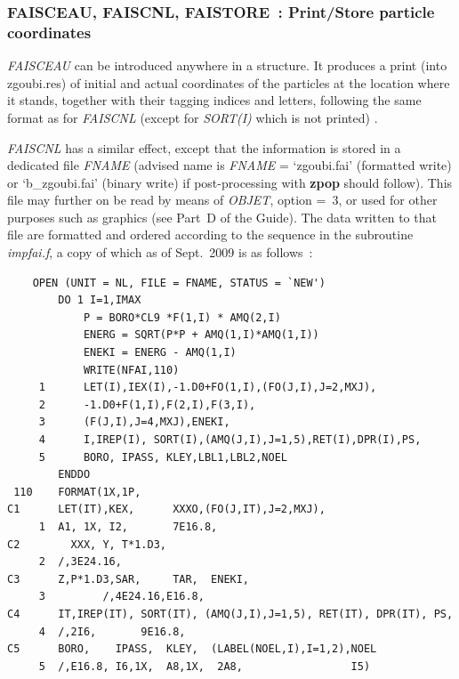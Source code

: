 \newpage

\subsubsection*{FAISCEAU, FAISCNL, FAISTORE~:  Print/Store particle coordinates} \label{FAISCEAU}\label{FAISCNL}
 \label{FAISTORE} 


\textsl{FAISCEAU}  can be introduced anywhere in a structure.  It produces a print  (into zgoubi.res) 
of  initial and actual coordinates of the  \IMAX{} particles at the location where it stands, 
together with their tagging indices and letters, following the same format as for \textsl{FAISCNL} (except 
for \textsl{SORT(I)}  which is not printed) .  

\bigskip

\noindent\textsl{FAISCNL} has a similar effect, except that the information is stored in a 
dedicated file \textsl{FNAME} (advised name is \textsl{FNAME} = `zgoubi.fai' 
(formatted write) or `b\_zgoubi.fai' (binary write) 
if post-processing with \textbf{zpop} should follow).  This file may further on be read by means of  \textsl{OBJET}, 
option \mbox{\KOBJ= 3}, or used for other purposes such as graphics (see Part~D of the Guide).  
The data written to that file are formatted and  ordered according to the \FORTRAN sequence 
in the subroutine \textsl{impfai.f}, a copy of which as of Sept.~2009 is as follows~:  

{\footnotesize
\begin{verbatim}
    OPEN (UNIT = NL, FILE = FNAME, STATUS = `NEW')
        DO 1 I=1,IMAX
            P = BORO*CL9 *F(1,I) * AMQ(2,I)
            ENERG = SQRT(P*P + AMQ(1,I)*AMQ(1,I))
            ENEKI = ENERG - AMQ(1,I)
            WRITE(NFAI,110)
     1      LET(I),IEX(I),-1.D0+FO(1,I),(FO(J,I),J=2,MXJ),
     2      -1.D0+F(1,I),F(2,I),F(3,I),
     3      (F(J,I),J=4,MXJ),ENEKI,
     4      I,IREP(I), SORT(I),(AMQ(J,I),J=1,5),RET(I),DPR(I),PS,
     5      BORO, IPASS, KLEY,LBL1,LBL2,NOEL
        ENDDO
 110    FORMAT(1X,1P, 
C1      LET(IT),KEX,      XXXO,(FO(J,IT),J=2,MXJ),
     1  A1, 1X, I2,       7E16.8,
C2        XXX, Y, T*1.D3,
     2  /,3E24.16,
C3      Z,P*1.D3,SAR,     TAR,  ENEKI,
     3         /,4E24.16,E16.8,
C4      IT,IREP(IT), SORT(IT), (AMQ(J,I),J=1,5), RET(IT), DPR(IT), PS,
     4  /,2I6,       9E16.8,
C5      BORO,    IPASS,  KLEY,  (LABEL(NOEL,I),I=1,2),NOEL
     5  /,E16.8, I6,1X,  A8,1X,  2A8,                 I5)
\end{verbatim}}
\medskip

